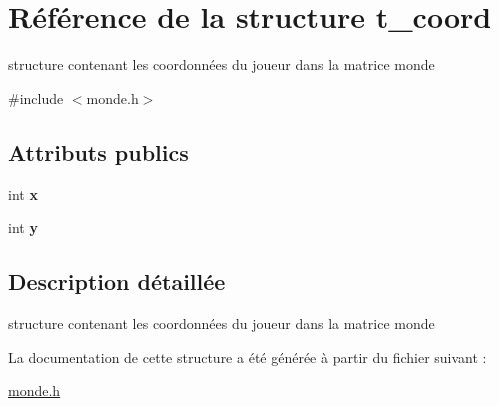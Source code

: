 \hypertarget{structt__coord}{\section{Référence de la structure t\-\_\-coord}
\label{structt__coord}
}


structure contenant les coordonnées du joueur dans la matrice monde  




{\ttfamily \#include $<$monde.\-h$>$}

\subsection*{Attributs publics}
\begin{DoxyCompactItemize}
\item 
\hypertarget{structt__coord_a706105c866467e96e29b1ddb7f3f8fdc}{int {\bfseries x}}\label{structt__coord_a706105c866467e96e29b1ddb7f3f8fdc}

\item 
\hypertarget{structt__coord_a21e0fb0f0b9c521e237b8c15dce9209f}{int {\bfseries y}}\label{structt__coord_a21e0fb0f0b9c521e237b8c15dce9209f}

\end{DoxyCompactItemize}


\subsection{Description détaillée}
structure contenant les coordonnées du joueur dans la matrice monde 

La documentation de cette structure a été générée à partir du fichier suivant \-:\begin{DoxyCompactItemize}
\item 
\hyperlink{monde_8h}{monde.\-h}\end{DoxyCompactItemize}
